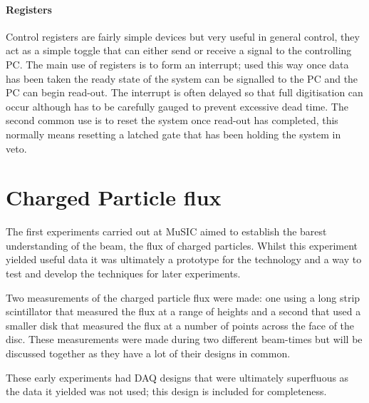 \subsubsection{Registers} %
\label{ssub:registers}
Control registers are fairly simple devices but very useful in general control, they act as a simple toggle that can either send or receive a signal to the controlling PC. The main use of registers is to form an interrupt; used this way once data has been taken the ready state of the system can be signalled to the PC and the PC can begin read-out. The interrupt is often delayed so that full digitisation can occur although has to be carefully gauged to prevent excessive dead time. The second common use is to reset the system once read-out has completed, this normally means resetting a latched gate that has been holding the system in veto.

\chapter{Charged Particle flux} %
\label{cha:charged_particle_flux}
The first experiments carried out at MuSIC aimed to establish the barest understanding of the beam, the flux of charged particles. Whilst this experiment yielded useful data it was ultimately a prototype for the technology and a way to test and develop the techniques for later experiments.

Two measurements of the charged particle flux were made: one using a long strip scintillator that measured the flux at a range of heights and a second that used a smaller disk that measured the flux at a number of points across the face of the disc. These measurements were made during two different beam-times but will be discussed together as they have a lot of their designs in common.

These early experiments had DAQ designs that were ultimately superfluous as the data it yielded was not used; this design is included for completeness.
